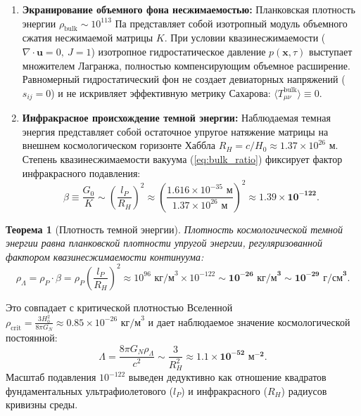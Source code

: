 \documentclass[11pt,a4paper]{article}
\newtheorem{theorem}{Теорема}[section]
\theoremstyle{definition}
\theoremstyle{remark}
\begin{document}
\begin{enumerate}
    \item \textbf{Экранирование объемного фона несжимаемостью:}
    Планковская плотность энергии $\rho_{\mathrm{bulk}} \sim 10^{113}\text{ Па}$ представляет собой изотропный модуль объемного сжатия несжимаемой матрицы $K$. При условии квазинесжимаемости ($\nabla \cdot \mathbf{u} = 0, \ J = 1$) изотропное гидростатическое давление $p(\mathbf{x}, \tau)$ выступает множителем Лагранжа, полностью компенсирующим объемное расширение. Равномерный гидростатический фон не создает девиаторных напряжений ($s_{ij} = 0$) и не искривляет эффективную метрику Сахарова: $\langle T_{\mu\nu}^{\mathrm{bulk}} \rangle \equiv 0$.

    \item \textbf{Инфракрасное происхождение темной энергии:}
    Наблюдаемая темная энергия представляет собой остаточное упругое натяжение матрицы на внешнем космологическом горизонте Хаббла $R_H = c / H_0 \approx 1.37 \times 10^{26}\text{ м}$. Степень квазинесжимаемости вакуума (\ref{eq:bulk_ratio}) фиксирует фактор инфракрасного подавления:
    \begin{equation}
        \beta \equiv \frac{G_0}{K} \sim \left( \frac{l_P}{R_H} \right)^2 \approx \left( \frac{1.616 \times 10^{-35}\text{ м}}{1.37 \times 10^{26}\text{ м}} \right)^2 \approx \mathbf{1.39 \times 10^{-122}}.
    \end{equation}
\end{enumerate}

\begin{theorem}[Плотность темной энергии]
Плотность космологической темной энергии равна планковской плотности упругой энергии, регуляризованной фактором квазинесжимаемости континуума:
\begin{equation}
    \rho_\Lambda = \rho_P \cdot \beta = \rho_P \left( \frac{l_P}{R_H} \right)^2 \approx 10^{96}\text{ кг/м}^3 \times 10^{-122} \sim \mathbf{10^{-26}\text{ кг/м}^3} \sim \mathbf{10^{-29}\text{ г/см}^3}.
    \label{eq:dark_energy_exact}
\end{equation}
\end{theorem}
Это совпадает с критической плотностью Вселенной $\rho_{\mathrm{crit}} = \frac{3 H_0^2}{8\pi G_N} \approx 0.85 \times 10^{-26}\text{ кг/м}^3$ и дает наблюдаемое значение космологической постоянной:
\begin{equation}
    \Lambda = \frac{8\pi G_N \rho_\Lambda}{c^2} \sim \frac{3}{R_H^2} \approx \mathbf{1.1 \times 10^{-52}\text{ м}^{-2}}.
\end{equation}
Масштаб подавления $10^{-122}$ выведен дедуктивно как отношение квадратов фундаментальных ультрафиолетового ($l_P$) и инфракрасного ($R_H$) радиусов кривизны среды.
\end{document}
